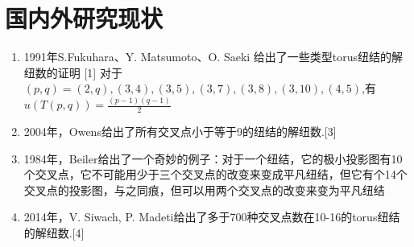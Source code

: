 \documentclass[bigger]{beamer}
\begin{document}
\section{国内外研究现状}
\label{sec:org98edfdd}
\begin{enumerate}
\item 1991年S.Fukuhara、Y. Matsumoto、O. Saeki 给出了一些类型torus纽结的解纽数的证明 [1]
\label{sec:orgca3289d}
对于\((p,q)=(2,q),(3,4),(3,5),(3,7),(3,8),(3,10),(4,5)\),有
\(u(T(p,q))=\frac{(p-1)(q-1)}{2}\)
\item 2004年，Owens给出了所有交叉点小于等于9的纽结的解纽数.[3]
\label{sec:org9ccaec4}
\item 1984年，Beiler给出了一个奇妙的例子：对于一个纽结，它的极小投影图有10个交叉点，它不可能用少于三个交叉点的改变来变成平凡纽结，但它有个14个交叉点的投影图，与之同痕，但可以用两个交叉点的改变来变为平凡纽结
\label{sec:org91f78d9}
\item 2014年，V. Siwach, P. Madeti给出了多于700种交叉点数在10-16的torus纽结的解纽数.[4]
\label{sec:orgb1b4c9b}
\end{enumerate}
\end{document}
